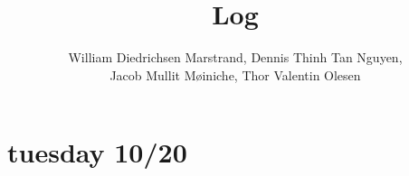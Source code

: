 \documentclass{article}
\title{Log}
\author{William Diedrichsen Marstrand, Dennis Thinh Tan Nguyen, 
\\Jacob Mullit Møiniche, Thor Valentin Olesen}
\begin{document}
\maketitle

\section{tuesday 10/20}
\end{document}
